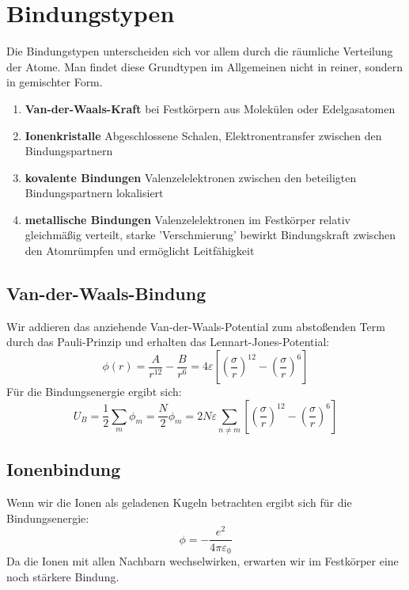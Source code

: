 \documentclass[11pt]{article}
\begin{document}
\section{Bindungstypen}
Die Bindungstypen unterscheiden sich vor allem durch die räumliche Verteilung
der Atome. Man findet diese Grundtypen im Allgemeinen nicht in reiner, sondern
in gemischter Form.
\begin{enumerate}
  \item \textbf{Van-der-Waals-Kraft} bei Festkörpern aus Molekülen oder
  Edelgasatomen
  \item \textbf{Ionenkristalle} Abgeschlossene Schalen, Elektronentransfer
  zwischen den Bindungspartnern
  \item \textbf{kovalente Bindungen} Valenzelelektronen zwischen den beteiligten
  Bindungspartnern lokalisiert
  \item \textbf{metallische Bindungen} Valenzelelektronen im Festkörper relativ
  gleichmäßig verteilt, starke 'Verschmierung' bewirkt Bindungskraft zwischen
  den Atomrümpfen und ermöglicht Leitfähigkeit
\end{enumerate}
\subsection{Van-der-Waals-Bindung}
Wir addieren das anziehende Van-der-Waals-Potential zum abstoßenden Term durch
das Pauli-Prinzip und erhalten das Lennart-Jones-Potential:
\begin{equation}
  \phi (r) = \frac{A}{r^{12}} - \frac{B}{r^{6}} = 4 \varepsilon \left[ \left(
  \frac{\sigma}{r} \right )^{12} - \left ( \frac{\sigma}{r} \right )^6 \right ]
\end{equation}
Für die Bindungsenergie ergibt sich:
\begin{equation}
  U_B = \frac{1}{2} \sum_m \phi_m = \frac{N}{2} \phi_m = 2N\varepsilon \sum_{
  n \neq m} \left[ \left(
  \frac{\sigma}{r} \right )^{12} - \left ( \frac{\sigma}{r} \right )^6 \right ]
\end{equation}
\subsection{Ionenbindung}
Wenn wir die Ionen als geladenen Kugeln betrachten ergibt sich für die
Bindungsenergie:
\begin{equation}
  \phi = -\frac{e^2}{4\pi\varepsilon_0}
\end{equation}
Da die Ionen mit allen Nachbarn wechselwirken, erwarten wir im Festkörper
eine noch stärkere Bindung.
\end{document}
